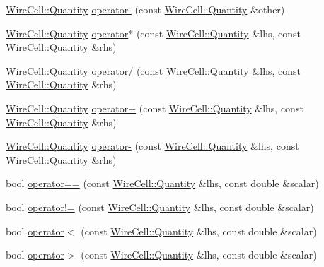 \begin{DoxyCompactItemize}
\item 
\hyperlink{class_wire_cell_1_1_quantity}{Wire\+Cell\+::\+Quantity} \hyperlink{namespace_wire_cell_ad9e6366de8387b1bac5e86f5934ab7ba}{operator-\/} (const \hyperlink{class_wire_cell_1_1_quantity}{Wire\+Cell\+::\+Quantity} \&other)
\item 
\hyperlink{class_wire_cell_1_1_quantity}{Wire\+Cell\+::\+Quantity} \hyperlink{namespace_wire_cell_a795a90cbc26590d08916714b56fdd8ec}{operator$\ast$} (const \hyperlink{class_wire_cell_1_1_quantity}{Wire\+Cell\+::\+Quantity} \&lhs, const \hyperlink{class_wire_cell_1_1_quantity}{Wire\+Cell\+::\+Quantity} \&rhs)
\item 
\hyperlink{class_wire_cell_1_1_quantity}{Wire\+Cell\+::\+Quantity} \hyperlink{namespace_wire_cell_a1bd2f1d12492973b304c8caddd3b328a}{operator/} (const \hyperlink{class_wire_cell_1_1_quantity}{Wire\+Cell\+::\+Quantity} \&lhs, const \hyperlink{class_wire_cell_1_1_quantity}{Wire\+Cell\+::\+Quantity} \&rhs)
\item 
\hyperlink{class_wire_cell_1_1_quantity}{Wire\+Cell\+::\+Quantity} \hyperlink{namespace_wire_cell_a371b6395c9b33a3471d9c754ef24981e}{operator+} (const \hyperlink{class_wire_cell_1_1_quantity}{Wire\+Cell\+::\+Quantity} \&lhs, const \hyperlink{class_wire_cell_1_1_quantity}{Wire\+Cell\+::\+Quantity} \&rhs)
\item 
\hyperlink{class_wire_cell_1_1_quantity}{Wire\+Cell\+::\+Quantity} \hyperlink{namespace_wire_cell_a3530fd2878c663a3575aad0ac6226679}{operator-\/} (const \hyperlink{class_wire_cell_1_1_quantity}{Wire\+Cell\+::\+Quantity} \&lhs, const \hyperlink{class_wire_cell_1_1_quantity}{Wire\+Cell\+::\+Quantity} \&rhs)
\item 
bool \hyperlink{namespace_wire_cell_aa6e0b8af0c1d7e1cddab2efdb66c92ae}{operator==} (const \hyperlink{class_wire_cell_1_1_quantity}{Wire\+Cell\+::\+Quantity} \&lhs, const double \&scalar)
\item 
bool \hyperlink{namespace_wire_cell_a01b41dc8ff8e255995b2f7614561f60c}{operator!=} (const \hyperlink{class_wire_cell_1_1_quantity}{Wire\+Cell\+::\+Quantity} \&lhs, const double \&scalar)
\item 
bool \hyperlink{namespace_wire_cell_a82ae32e730a05ffdcc611b09d72076fe}{operator$<$} (const \hyperlink{class_wire_cell_1_1_quantity}{Wire\+Cell\+::\+Quantity} \&lhs, const double \&scalar)
\item 
bool \hyperlink{namespace_wire_cell_a998a57c55b36e2d63d5cb6c726153215}{operator$>$} (const \hyperlink{class_wire_cell_1_1_quantity}{Wire\+Cell\+::\+Quantity} \&lhs, const double \&scalar)

\end{DoxyCompactItemize}

